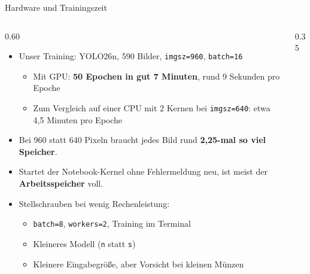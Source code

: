 \begin{frame}{Hardware und Trainingszeit}
\footnotesize
{}
\begin{columns}
\begin{column}{0.60\textwidth}
\begin{itemize}
  \item Unser Training: YOLO26n, 590 Bilder, \texttt{imgsz=960}, \texttt{batch=16}
  \begin{itemize}
    \item Mit GPU: \textbf{50 Epochen in gut 7 Minuten}, rund 9 Sekunden pro Epoche
    \item Zum Vergleich auf einer CPU mit 2 Kernen bei \texttt{imgsz=640}: etwa 4,5 Minuten pro Epoche
  \end{itemize}
  \item Bei 960 statt 640 Pixeln braucht jedes Bild rund \textbf{2,25-mal so viel Speicher}.
  \item Startet der Notebook-Kernel ohne Fehlermeldung neu, ist meist der \textbf{Arbeitsspeicher} voll.
  \item Stellschrauben bei wenig Rechenleistung:
  \begin{itemize}
    \item \texttt{batch=8}, \texttt{workers=2}, Training im Terminal
    \item Kleineres Modell (\texttt{n} statt \texttt{s})
    \item Kleinere Eingabegröße, aber Vorsicht bei kleinen Münzen
  \end{itemize}
\end{itemize}
\end{column}
\begin{column}{0.35\textwidth}
\centering
{}
\end{column}
\end{columns}
\end{frame}

